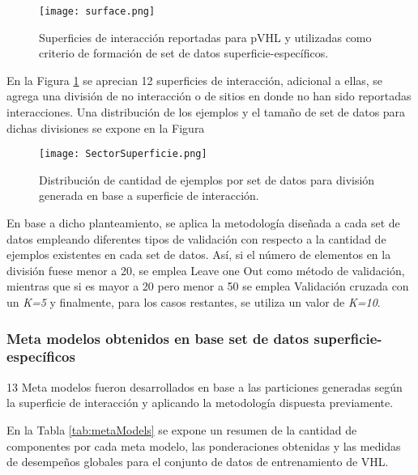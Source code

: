 \begin{figure}[!h]
	\centering
	\texttt{[image: surface.png]}
	\caption{Superficies de interacción reportadas para pVHL y utilizadas como criterio de formación de set de datos superficie-específicos.}
	\label{surface}
\end{figure}

En la Figura \ref{surface} se aprecian 12 superficies de interacción, adicional a ellas, se agrega una división de no interacción o de sitios en donde no han sido reportadas interacciones. Una distribución de los ejemplos y el tamaño de set de datos para dichas divisiones se expone en la Figura 

\begin{figure}[!h]
	\centering
	\texttt{[image: SectorSuperficie.png]}
	\caption{Distribución de cantidad de ejemplos por set de datos para división generada en base a superficie de interacción.}
	\label{surfac2}
\end{figure}

En base a dicho planteamiento, se aplica la metodología diseñada a cada set de datos empleando diferentes tipos de validación con respecto a la cantidad de ejemplos existentes en cada set de datos. Así, si el número de elementos en la división fuese menor a 20, se emplea Leave one Out como método de validación, mientras que si es mayor a 20 pero menor a 50 se emplea Validación cruzada con un \textit{K=5} y finalmente, para los casos restantes, se utiliza un valor de \textit{K=10}.

\subsubsection{Meta modelos obtenidos en base set de datos superficie-específicos}

13 Meta modelos fueron desarrollados en base a las particiones generadas según la superficie de interacción y aplicando la metodología dispuesta previamente.

En la Tabla \ref{tab:metaModels} se expone un resumen de la cantidad de componentes por cada meta modelo, las ponderaciones obtenidas y las medidas de desempeños globales para el conjunto de datos de entrenamiento de VHL.


